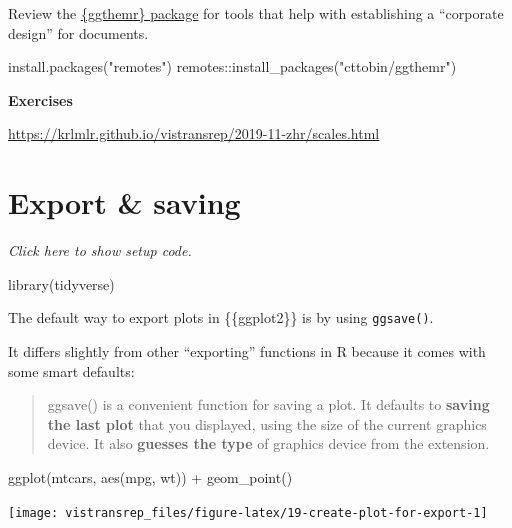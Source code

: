 \documentclass[]{book}
\newenvironment{Shaded}{}{}
\newcommand{\KeywordTok}[1]{\textcolor[rgb]{0.00,0.00,1.00}{#1}}
\newcommand{\NormalTok}[1]{#1}
\newcommand{\OperatorTok}[1]{#1}
\newcommand{\StringTok}[1]{\textcolor[rgb]{0.00,0.50,0.50}{#1}}
\begin{document}
Review the \href{https://github.com/cttobin/ggthemr}{\{ggthemr\} package} for tools that help with establishing a ``corporate design'' for documents.

\begin{Shaded}
\begin{Highlighting}[]
\KeywordTok{install.packages}\NormalTok{(}\StringTok{"remotes"}\NormalTok{)}
\NormalTok{remotes}\OperatorTok{::}\KeywordTok{install_packages}\NormalTok{(}\StringTok{"cttobin/ggthemr"}\NormalTok{)}
\end{Highlighting}
\end{Shaded}

\textbf{Exercises}

\url{https://krlmlr.github.io/vistransrep/2019-11-zhr/scales.html}

\hypertarget{export-saving}{%
\section{Export \& saving}\label{export-saving}}

\emph{Click here to show setup code.}

\begin{Shaded}
\begin{Highlighting}[]
\KeywordTok{library}\NormalTok{(tidyverse)}
\end{Highlighting}
\end{Shaded}

The default way to export plots in \{\{ggplot2\}\} is by using \texttt{ggsave()}.

It differs slightly from other ``exporting'' functions in R because it comes with some smart defaults:

\begin{quote}
ggsave() is a convenient function for saving a plot. It defaults to \textbf{saving the last plot} that you displayed, using the size of the current graphics device. It also \textbf{guesses the type} of graphics device from the extension.
\end{quote}

\begin{Shaded}
\begin{Highlighting}[]
\KeywordTok{ggplot}\NormalTok{(mtcars, }\KeywordTok{aes}\NormalTok{(mpg, wt)) }\OperatorTok{+}
\StringTok{  }\KeywordTok{geom_point}\NormalTok{()}
\end{Highlighting}
\end{Shaded}

\begin{flushright}\texttt{[image: vistransrep\_files/figure-latex/19-create-plot-for-export-1]} \end{flushright}
\end{document}
